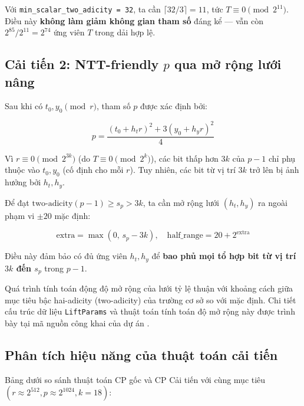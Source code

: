 Với \texttt{min\_scalar\_two\_adicity\ =\ 32}, ta cần
\(\lceil 32/3 \rceil = 11\), tức \(T \equiv 0 \pmod{2^{11}}\). Điều này
\textbf{không làm giảm không gian tham số} đáng kể --- vẫn còn
\(2^{85}/2^{11} = 2^{74}\) ứng viên \(T\) trong dải hợp lệ.

\subsection{\texorpdfstring{Cải tiến 2: NTT-friendly \(p\) qua mở rộng
lưới
nâng}{Cải tiến 2: NTT-friendly p qua mở rộng lưới nâng}}\label{cux1ea3i-tiux1ebfn-2-ntt-friendly-p-qua-mux1edf-rux1ed9ng-lux1b0ux1edbi-nuxe2ng}

Sau khi có \(t_0, y_0 \pmod{r}\), tham số \(p\) được xác định bởi:

\[p = \frac{(t_0 + h_t r)^2 + 3(y_0 + h_y r)^2}{4}\]

Vì \(r \equiv 0 \pmod{2^{3k}}\) (do \(T \equiv 0 \pmod{2^k}\)), các bit
thấp hơn \(3k\) của \(p-1\) chỉ phụ thuộc vào \(t_0, y_0\) (cố định cho
mỗi \(r\)). Tuy nhiên, các bit từ vị trí \(3k\) trở lên bị ảnh hưởng bởi
\(h_t, h_y\).

Để đạt \(\text{two-adicity}(p-1) \geq s_p > 3k\), ta cần mở rộng lưới
\((h_t, h_y)\) ra ngoài phạm vi \(\pm 20\) mặc định:

\[\text{extra} = \max(0,\, s_p - 3k), \quad \text{half\_range} = 20 + 2^{\text{extra}}\]

Điều này đảm bảo có đủ ứng viên \(h_t, h_y\) để \textbf{bao phủ mọi tổ
hợp bit từ vị trí \(3k\) đến \(s_p\)} trong \(p-1\).

Quá trình tính toán động độ mở rộng của lưới tỷ lệ thuận với khoảng cách
giữa mục tiêu bậc hai-adicity (two-adicity) của trường cơ sở so với mặc
định. Chi tiết cấu trúc dữ liệu \texttt{LiftParams} và thuật toán tính
toán độ mở rộng này được trình bày tại mã nguồn công khai của dự án
\citep{LumenMath}.

\subsection{Phân tích hiệu năng của thuật toán cải
tiến}\label{phuxe2n-tuxedch-hiux1ec7u-nux103ng-cux1ee7a-thuux1eadt-touxe1n-cux1ea3i-tiux1ebfn}

Bảng dưới so sánh thuật toán CP gốc và CP Cải tiến với cùng mục tiêu
\((r \approx 2^{512}, p \approx 2^{1024}, k = 18)\):

